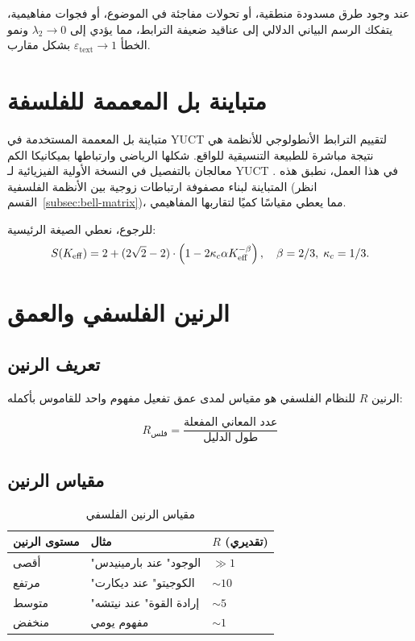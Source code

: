 \documentclass[11pt,a4paper]{article}
\newcommand{\kappac}{\kappa_c}
\newcommand{\betaf}{\beta}
\begin{document}
	عند وجود طرق مسدودة منطقية، أو تحولات مفاجئة في الموضوع، أو فجوات مفاهيمية، يتفكك الرسم البياني الدلالي إلى عناقيد ضعيفة الترابط، مما يؤدي إلى \(\lambda_2 \to 0\) ونمو الخطأ \(\varepsilon_{\text{text}} \to 1\) بشكل مقارب.
	
	\section{متباينة بل المعممة للفلسفة}
	
	متباينة بل المعممة المستخدمة في YUCT لتقييم الترابط الأنطولوجي للأنظمة هي نتيجة مباشرة للطبيعة التنسيقية للواقع. شكلها الرياضي وارتباطها بميكانيكا الكم معالجان بالتفصيل في النسخة الأولية الفيزيائية لـ YUCT \cite{Yakushev2026b}. في هذا العمل، نطبق هذه المتباينة لبناء مصفوفة ارتباطات زوجية بين الأنظمة الفلسفية (انظر القسم~\ref{subsec:bell-matrix})، مما يعطي مقياسًا كميًا لتقاربها المفاهيمي.
	
	للرجوع، نعطي الصيغة الرئيسية:
	\[
	S(\Keff) = 2 + (2\sqrt{2} - 2) \cdot \left(1 - 2\kappac \alpha \Keff^{-\betaf}\right), \quad \betaf=2/3,\; \kappac=1/3.
	\]
	
	\section{الرنين الفلسفي والعمق}
	
	\subsection{تعريف الرنين}
	
	الرنين \(R\) للنظام الفلسفي هو مقياس لمدى عمق تفعيل مفهوم واحد للقاموس بأكمله:
	
	\begin{equation}
		R_{\text{فلس}} = \frac{\text{عدد المعاني المفعلة}}{\text{طول الدليل}}
	\end{equation}
	
	\subsection{مقياس الرنين}
	
	\begin{table}[H]
		\centering
		\caption{مقياس الرنين الفلسفي}
		\begin{tabular}{p{4cm}p{5cm}p{5cm}}
			\toprule
			\textbf{مستوى الرنين} & \textbf{مثال} & \textbf{\(R\) (تقديري)} \\
			\midrule
			أقصى & "الوجود" عند بارمينيدس & \(\gg 1\) \\
			مرتفع & "الكوجيتو" عند ديكارت & \(\sim 10\) \\
			متوسط & "إرادة القوة" عند نيتشه & \(\sim 5\) \\
			منخفض & مفهوم يومي & \(\sim 1\) \\
			\bottomrule
		\end{tabular}
	\end{table}
	
\end{document}
